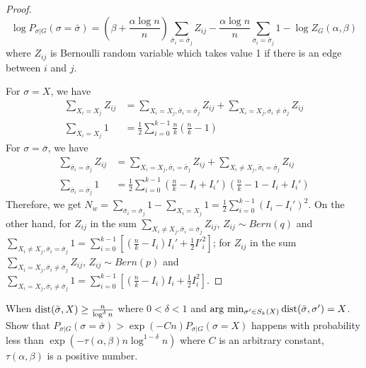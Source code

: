 \documentclass{article}
\begin{document}
\begin{proof}
	$$ \log P_{\sigma|G}(\sigma=\bar{\sigma}) = (\beta + \frac{\alpha \log n}{n}) \sum_{\bar{\sigma}_i = \bar{\sigma}_j} Z_{ij}
	- \frac{\alpha \log n}{n} \sum_{\bar{\sigma}_i = \bar{\sigma}_j} 1  - \log Z_G(\alpha, \beta)
	$$
	where $Z_{ij}$ is Bernoulli random variable which takes value 1 if there is an edge between $i$ and $j$.
	
	For $\sigma = X$, we have
	\begin{align*}
	\sum_{X_i = X_j} Z_{ij} &= \sum_{X_i = X_j, \bar{\sigma}_i = \bar{\sigma}_j} Z_{ij} + \sum_{X_i = X_j, \bar{\sigma}_i \neq \bar{\sigma}_j} Z_{ij} \\
	\sum_{X_i = X_j} 1 &= \frac{1}{2} \sum_{i=0}^{k-1} \frac{n}{k} ( \frac{n}{k} - 1 )
	\end{align*}
	For $\sigma = \bar{\sigma}$, we have
	\begin{align*}
	\sum_{\bar{\sigma}_i = \bar{\sigma}_j} Z_{ij} &= \sum_{X_i = X_j, \bar{\sigma}_i = \bar{\sigma}_j} Z_{ij} + \sum_{X_i \neq X_j, \bar{\sigma}_i = \bar{\sigma}_j} Z_{ij} \\
	\sum_{\bar{\sigma}_i = \bar{\sigma}_j} 1 &= \frac{1}{2} \sum_{i=0}^{k-1} (\frac{n}{k} - I_i + I_i') ( \frac{n}{k} - 1 - I_i + I_i')
	\end{align*}
	Therefore, we get
	$N_w = \sum_{\bar{\sigma}_i = \bar{\sigma}_j} 1  -\sum_{X_i = X_j} 1 = \frac{1}{2}\sum_{i=0}^{k-1} (I_i - I_i')^2 $.
	On the other hand, for $Z_{ij}$ in the sum $\sum_{X_i \neq X_j, \bar{\sigma}_i = \bar{\sigma}_j} Z_{ij}$, $Z_{ij} \sim Bern(q)$ and
	$\sum_{X_i \neq X_j, \bar{\sigma}_i = \bar{\sigma}_j} 1 = \sum_{i=0}^{k-1}[(\frac{n}{k} - I_i) I_i' + \frac{1}{2} I'^2_i ]$;
	for $Z_{ij}$ in the sum $\sum_{X_i = X_j, \bar{\sigma}_i \neq \bar{\sigma}_j} Z_{ij}$, $Z_{ij} \sim Bern(p)$ and
	$\sum_{X_i = X_j, \bar{\sigma}_i \neq \bar{\sigma}_j} 1 = \sum_{i=0}^{k-1}[(\frac{n}{k} - I_i) I_i + \frac{1}{2} I^2_i ]$.
\end{proof}
\begin{lemma}\label{lem:sigmaX}
		When $\operatorname{dist}(\bar{\sigma}, X) \geq \frac{n}{\log^{\delta} n}$ where $0<\delta < 1$ and $\arg\,\min_{\sigma'\in S_k(X)} \operatorname{dist}(\bar{\sigma}, \sigma') = X$. Show that
	$P_{\sigma | G}(\sigma = \bar{\sigma} ) > \exp(-Cn) P_{\sigma | G}(\sigma = X)$
	happens with probability less than $\exp(-\tau(\alpha,\beta) n \log^{1-\delta} n )$ where $C$ is an arbitrary constant, $\tau(\alpha,\beta)$ is a positive number.
\end{lemma}
\end{document}
